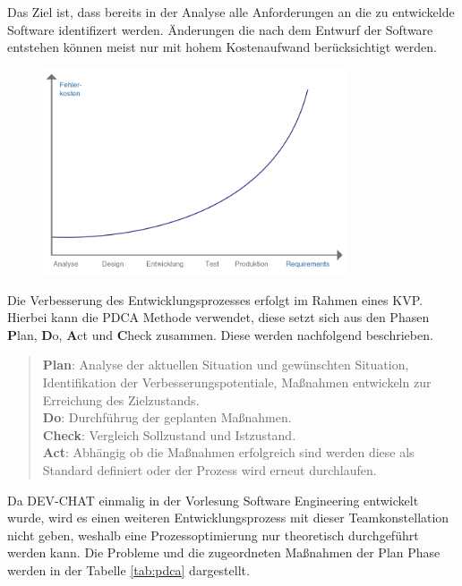 Das Ziel ist, dass bereits in der Analyse alle Anforderungen an die zu entwickelde Software identifizert werden.
Änderungen die nach dem Entwurf der Software entstehen können meist nur mit hohem Kostenaufwand berücksichtigt werden.
\autocite[vgl.][S. 95]{witte_testmanagement_2019}
\begin{figure}[H]
    \centering
    \includegraphics[width=0.8\textwidth]{images/boehm.png}
    \label{fig:boehm}
\end{figure}\noindent
Die Verbesserung des Entwicklungsprozesses erfolgt im Rahmen eines \ac{KVP}.
Hierbei kann die PDCA Methode verwendet, diese setzt sich aus den Phasen \textbf{P}lan, \textbf{D}o, \textbf{A}ct und \textbf{C}heck zusammen.
Diese werden nachfolgend beschrieben.
\begin{quote}
    \textbf{Plan}: Analyse der aktuellen Situation und gewünschten Situation, Identifikation der Verbesserungspotentiale, Maßnahmen entwickeln zur Erreichung des Zielzustands.\\
    \textbf{Do}: Durchführug der geplanten Maßnahmen.\\
    \textbf{Check}: Vergleich Sollzustand und Istzustand.\\
    \textbf{Act}: Abhängig ob die Maßnahmen erfolgreich sind werden diese als Standard definiert oder der Prozess wird erneut durchlaufen.
\end{quote}
Da DEV-CHAT einmalig in der Vorlesung Software Engineering entwickelt wurde, wird es einen weiteren Entwicklungsprozess mit dieser Teamkonstellation nicht geben, weshalb eine Prozessoptimierung nur theoretisch durchgeführt werden kann.
Die Probleme und die zugeordneten Maßnahmen der Plan Phase werden in der Tabelle \ref{tab:pdca} dargestellt.
